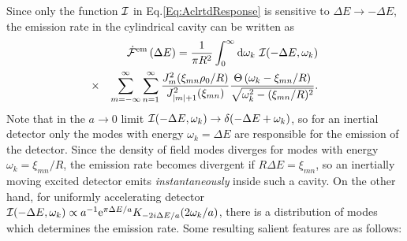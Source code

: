 \documentclass[aps,prl,nofootinbib,preprintnumbers,floatfix,twocolumn,superscriptaddress]{revtex4}
\def\nn{\nonumber}
\def\nn{\nonumber}
\def\l{\left}
\def\r{\right}
\def\d{{\rm d}}
\def\f{\frac}
\def\e{{\rm e}}
\begin{document}
Since only the function ${\cal I}$ in Eq.\eqref{Eq:AclrtdResponse} 
is sensitive to $\Delta E \rightarrow -\Delta E$, the 
emission rate in the cylindrical cavity can be written as
\begin{eqnarray}
\label{eqn:InertialEmissionIntegralForm}
 & & {\dot {\cal F}}^{\rm em}
 \l(\Delta E\r)=\f{1}{\pi R^2} \int_{0}^{\infty} \d \omega_k ~
 {\cal I}(-\Delta E, \omega_k) \nn \\
 &\times& \sum_{m=-\infty}^{\infty} \sum_{n=1}^{\infty}
 \f{J_{m}^2(\xi_{mn} \rho_0/R)}{J^2_{|m|+1}(\xi_{mn})}
 \f{\Theta\l(\omega_k-\xi_{mn}/R\r)}{\sqrt{\omega_k^2-(\xi_{mn}/R)^2}}.
\end{eqnarray}
Note that in the $a\rightarrow 0$ limit ${\cal I}(-\Delta E, \omega_k) \rightarrow\delta(-\Delta E+\omega_{k})$, 
so for an inertial detector only the modes with energy $\omega_{k}=\Delta E$ 
are responsible for the 
emission of the detector. Since the density of field modes 
diverges for modes with energy 
$\omega_{k}=\xi_{mn}/R$, the emission rate becomes divergent if $R \Delta E=\xi_{mn}$, so 
an inertially moving excited detector emits {\it instantaneously} inside such a cavity. 
On the other hand, for uniformly accelerating detector
${\cal I}(-\Delta E, \omega_k) \propto a^{-1}\e^{\pi \Delta E/a} 
K_{-2i\Delta E/a}(2 \omega_k/a)$, there is a 
distribution of modes which determines the emission rate. Some resulting salient 
features are as follows:
\end{document}
